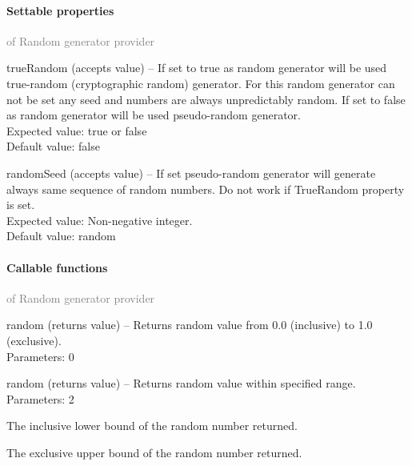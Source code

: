 	\paragraph{Settable properties}\textcolor{gray}{of Random generator provider}
	\begin{description*}
		\item[trueRandom]
		(accepts value)
			-- If set to true as random generator will be used
            true-random (cryptographic random) generator.
            For this random generator can not be set any seed and numbers are
            always unpredictably random.
            If set to false as random generator will be used pseudo-random generator.
			\\ Expected value: true or false
			\\ Default value: false
		\item[randomSeed]
		(accepts value)
			-- If set pseudo-random generator will generate always same sequence of random numbers.
            Do not work if TrueRandom property is set.
			\\ Expected value: Non-negative integer.
			\\ Default value: random
	\end{description*}
	\paragraph{Callable functions}\textcolor{gray}{of Random generator provider}
	\begin{description*}
		\item[random]
		(returns value)
			-- Returns random value from 0.0 (inclusive) to 1.0 (exclusive).
		\\ Parameters: 0
		\item[random]
		(returns value)
			-- Returns random value within specified range.
		\\ Parameters: 2
			\begin{enumerate*}
				\item The inclusive lower bound of the random number returned.
				\item             The exclusive upper bound of the random number returned.
			\end{enumerate*}
	\end{description*}
	


